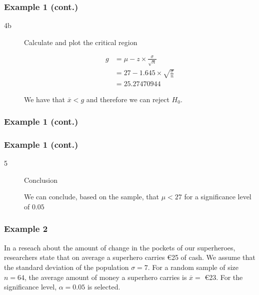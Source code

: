 \documentclass[aspectratio=169]{beamer}
\begin{document}
\begin{frame}
  \frametitle{Example 1 (cont.)}
  
  \begin{description}
    
    \item[4b] Calculate and plot the critical region
    
    \begin{align*}
    g &= \mu - z \times \frac{\sigma}{\sqrt{n}} \\
    &= 27 - 1.645 \times \sqrt{\frac{\sigma}{n}} \\
    &= 25.27470944
    \end{align*}
    
    We have that $\overline{x} < g$ and therefore we can reject $H_{0}$.
  \end{description}
\end{frame}

\begin{frame}
  \frametitle{Example 1 (cont.)}
  
  \bigskip
  \centering
\end{frame}

\begin{frame}
  \frametitle{Example 1 (cont.)}
  
  \begin{description}
    
    \item[5] Conclusion
    
    We can conclude, based on the sample, that $\mu < 27$ for a significance level of $0.05$
  \end{description}
\end{frame}


\begin{frame}
  \frametitle{Example 2}
  In a reseach about the amount of change in the pockets of our superheroes, researchers state that on average a superhero carries \euro{25} of cash.
  We assume that the standard deviation of the population $\sigma = 7$.
  For a random sample of size $n=64$, the average amount of money a superhero carries is $\overline{x} = $ \euro{23}. 
  For the significance level, $\alpha = 0.05$ is selected.
\end{frame}
\end{document}
